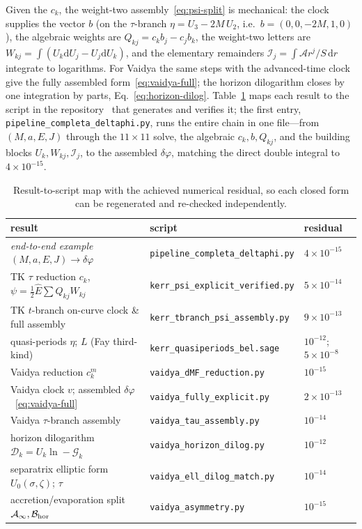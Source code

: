 \documentclass[12pt]{iopart}
\newcommand{\Ehat}{\hat E}
\newcommand{\dd}{\mathrm{d}}
\begin{document}
Given the $c_k$, the weight-two assembly~\eqref{eq:psi-split} is mechanical: the
clock supplies the vector $b$ (on the $\tau$-branch $\eta=U_3-2M\,U_2$, i.e.\
$b=(0,0,-2M,1,0)$), the algebraic weights are $Q_{kj}=c_kb_j-c_jb_k$, the weight-two
letters are $W_{kj}=\int(U_k\dd U_j-U_j\dd U_k)$, and the elementary remainders
$\mathcal{I}_j=\int\mathcal{A}r^j/S\,\dd r$ integrate to logarithms. For Vaidya the
same steps with the advanced-time clock give the fully assembled
form~\eqref{eq:vaidya-full}; the horizon dilogarithm closes by one integration by
parts, Eq.~\eqref{eq:horizon-dilog}. Table~\ref{tab:script-map} maps each result to
the script in the repository~\cite{Rosignoli2026Code} that generates and verifies it;
the first entry, \texttt{pipeline\_completa\_deltaphi.py}, runs the entire chain in one
file---from $(M,a,E,J)$ through the $11\times11$ solve, the algebraic $c_k,b,Q_{kj}$,
and the building blocks $U_k,W_{kj},\mathcal{I}_j$, to the assembled $\delta\varphi$,
matching the direct double integral to $4\times10^{-15}$.
\begin{table}[htbp]
    \centering
    \caption{Result-to-script map with the achieved numerical residual, so each
    closed form can be regenerated and re-checked independently.}
    \label{tab:script-map}
    \begin{tabular}{lll}
        \hline\hline
        result & script & residual\\
        \hline
        \emph{end-to-end example} $(M,a,E,J)\!\to\!\delta\varphi$
            & \texttt{pipeline\_completa\_deltaphi.py} & $4\times10^{-15}$\\
        TK $\tau$ reduction $c_k$, $\psi=\tfrac12\Ehat\sum Q_{kj}W_{kj}$
            & \texttt{kerr\_psi\_explicit\_verified.py} & $5\times10^{-14}$\\
        TK $t$-branch on-curve clock \& full assembly
            & \texttt{kerr\_tbranch\_psi\_assembly.py} & $9\times10^{-13}$\\
        quasi-periods $\eta$; $L$ (Fay third-kind)
            & \texttt{kerr\_quasiperiods\_bel.sage} & $10^{-12}$; $5\times10^{-8}$\\
        Vaidya reduction $c_k^m$
            & \texttt{vaidya\_dMF\_reduction.py} & $10^{-15}$\\
        Vaidya clock $v$; assembled $\delta\varphi$~\eqref{eq:vaidya-full}
            & \texttt{vaidya\_fully\_explicit.py} & $2\times10^{-13}$\\
        Vaidya $\tau$-branch assembly
            & \texttt{vaidya\_tau\_assembly.py} & $10^{-14}$\\
        horizon dilogarithm $\mathcal{D}_k=U_k\ln-\mathcal{G}_k$
            & \texttt{vaidya\_horizon\_dilog.py} & $10^{-12}$\\
        separatrix elliptic form $U_0(\sigma,\zeta)$; $\tau$
            & \texttt{vaidya\_ell\_dilog\_match.py} & $10^{-14}$\\
        accretion/evaporation split $\mathcal{A}_\infty,\mathcal{B}_{\rm hor}$
            & \texttt{vaidya\_asymmetry.py} & $10^{-15}$\\
        \hline\hline
    \end{tabular}
\end{table}
\end{document}
